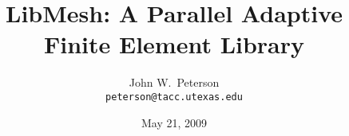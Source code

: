 




\newcommand{\dgammadT}{\frac{\partial \gamma}{\partial T}}
\newcommand{\cpp}{C{\tiny$^{++}$}}
\newcommand{\nablaG}{\nabla_{\!\Gamma}}
\newcommand{\freesurf}{\partial \Omega_s}
\newcommand{\LibMesh}{\texttt{Lib\-Mesh}}
\newcommand{\Benard}{B\'{e}\-nard}
\newcommand{\slip}{\mathpzc{L}}
\newcommand{\bv}[1]{{\boldsymbol{#1}}}

\author[J.~W.~Peterson]{
  \texorpdfstring{John W.~Peterson \\
    \texttt{\tiny peterson@tacc.utexas.edu}}{John W.~Peterson}}



\title[LibMesh]
      {LibMesh: A Parallel Adaptive Finite Element Library}
\date{May 21, 2009}
















